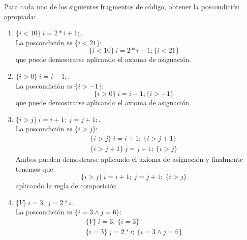 \begin{ejercicio}
    Para cada uno de los siguientes fragmentos de código, obtener la poscondición apropiada:
    \begin{enumerate}
        \item $\{i<10\}\ i=2\ast i+1;$.\\
            La poscondición es $\{i<21\}$:
            \begin{equation*}
                \{i<10\}\ i=2\ast i+1; \{i<21\}
            \end{equation*}
            que puede demostrarse aplicando el axioma de asignación.
        \item $\{i>0\}\ i=i-1;$.\\
            La poscondición es $\{i>-1\}$:
            \begin{equation*}
                \{i>0\}\ i=i-1; \{i>-1\}
            \end{equation*}
            que puede demostrarse aplicando el axioma de asignación.
        \item $\{i>j\}\ i=i+1;\ j=j+1;$.\\
            La poscondición es $\{i>j\}$:
            \begin{gather*}
                \{i>j\}\ i=i+1;\ \{i>j+1\} \\
                \{i>j+1\}\ j=j+1;\ \{i>j\}
            \end{gather*}
            Ambos pueden demostrarse aplicando el axioma de asignación y finalmente tenemos que:
            \begin{equation*}
                \{i>j\}\ i=i+1;\ j=j+1;\ \{i>j\}
            \end{equation*}
            aplicando la regla de composición.
        \item $\{V\}\ i=3;\ j=2\ast i$.\\
            La poscondición es $\{i=3 \land j=6\}$:
            \begin{gather*}
                \{V\}\ i=3;\ \{i=3\} \\
                \{i=3\}\ j=2\ast i;\ \{i=3 \land j = 6\}
            \end{gather*}
    \end{enumerate}
\end{ejercicio}

